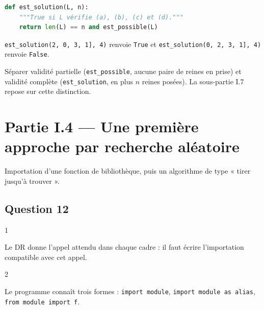 \documentclass[11pt,a4paper]{article}
\begin{document}
\begin{lstlisting}[language=Python]
def est_solution(L, n):
    """True si L vérifie (a), (b), (c) et (d)."""
    return len(L) == n and est_possible(L)
\end{lstlisting}

\texttt{est\_solution(\allowbreak{}{[}2,\allowbreak{}\ 0,\allowbreak{}\ 3,\allowbreak{}\ 1{]}\allowbreak{},\allowbreak{}\ 4)\allowbreak{}} renvoie \texttt{True} et \texttt{est\_solution(\allowbreak{}{[}0,\allowbreak{}\ 2,\allowbreak{}\ 3,\allowbreak{}\ 1{]}\allowbreak{},\allowbreak{}\ 4)\allowbreak{}} renvoie \texttt{False}.

\begin{methode}

Séparer validité partielle (\texttt{est\_possible}, aucune paire de reines en prise) et validité complète (\texttt{est\_solution}, en plus \(n\) reines posées). La sous-partie I.7 repose sur cette distinction.

\end{methode}

\hypertarget{partie-i.4-une-premiuxe8re-approche-par-recherche-aluxe9atoire}{%
\section{Partie I.4 --- Une première approche par recherche aléatoire}\label{partie-i.4-une-premiuxe8re-approche-par-recherche-aluxe9atoire}}

Importation d'une fonction de bibliothèque, puis un algorithme de type « tirer jusqu'à trouver ».

\hypertarget{question-12}{%
\subsection{Question 12}\label{question-12}}

\begin{indication}{1}

Le DR donne l'appel attendu dans chaque cadre : il faut écrire l'importation compatible avec cet appel.

\end{indication}

\begin{indication}{2}

Le programme connaît trois formes : \texttt{import\ module}, \texttt{import\ module\ as\ alias}, \texttt{from\ module\ import\ f}.

\end{indication}
\end{document}

